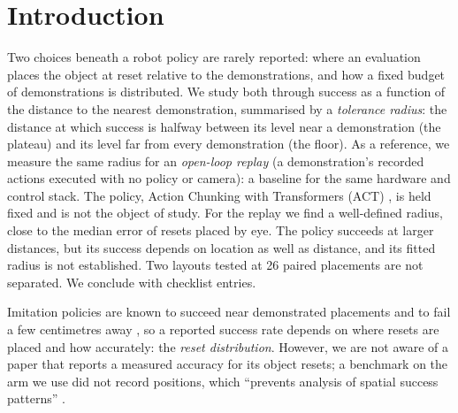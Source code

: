 \section{Introduction}
\label{sec:intro}

Two choices beneath a robot policy are rarely reported: where an evaluation places the object at reset relative to the demonstrations, and how a fixed budget of demonstrations is distributed.
We study both through success as a function of the distance to the nearest demonstration, summarised by a \emph{tolerance radius}: the distance at which success is halfway between its level near a demonstration (the plateau) and its level far from every demonstration (the floor).
As a reference, we measure the same radius for an \emph{open-loop replay} (a demonstration's recorded actions executed with no policy or camera): a baseline for the same hardware and control stack.
The policy, Action Chunking with Transformers (ACT) \cite{zhao2023learning}, is held fixed and is not the object of study.
For the replay we find a well-defined radius, close to the median error of resets placed by eye. The policy succeeds at larger distances, but its success depends on location as well as distance, and its fitted radius is not established. Two layouts tested at 26 paired placements are not separated. We conclude with checklist entries. %

Imitation policies are known to succeed near demonstrated placements and to fail a few centimetres away \cite{xue2025demogen,zhao2025proprioceptive,andresg2026demonstration,sumarac2026act}, so a reported success rate depends on where resets are placed and how accurately: the \emph{reset distribution}.
However, we are not aware of a paper that reports a measured accuracy for its object resets; a benchmark on the arm we use did not record positions, which ``prevents analysis of spatial success patterns'' \cite{selvaraj2026armnetbench}.

